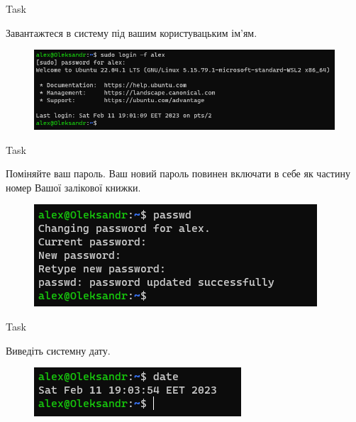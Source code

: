 \documentclass[a4paper,12pt]{article}
\newcommand{\RomanNumeralCaps}[1]{\MakeUppercase{\romannumeral #1}}
\begin{document}
\newpage
    \begin{center}
        \Large{Task \RomanNumeralCaps{1}}
    \end{center}
    Завантажтеся в систему під вашим користувацьким ім'ям.
    \begin{figure}[h!]
        \begin{minipage}[h]{1\linewidth}
            \centering
            \includegraphics[width=0.7\linewidth]{Prt sc/Figure_1.png}  
        \end{minipage}
    \end{figure}

    \begin{center}
        \Large{Task \RomanNumeralCaps{2}}
    \end{center}
    Поміняйте ваш пароль. Ваш новий пароль повинен включати в себе як частину номер Вашої залікової книжки.
    \begin{figure}[h!]
        \begin{minipage}[h]{1\linewidth}
            \centering
            \includegraphics[width=0.7\linewidth]{Prt sc/Figure_2.png}  
        \end{minipage}
    \end{figure}

    \begin{center}
        \Large{Task \RomanNumeralCaps{3}}
    \end{center}
    Виведіть системну дату.
    \begin{figure}[h!]
        \begin{minipage}[h]{1\linewidth}
            \centering
            \includegraphics[width=0.6\linewidth]{Prt sc/Figure_3.png}  
        \end{minipage}
    \end{figure}
\end{document}
